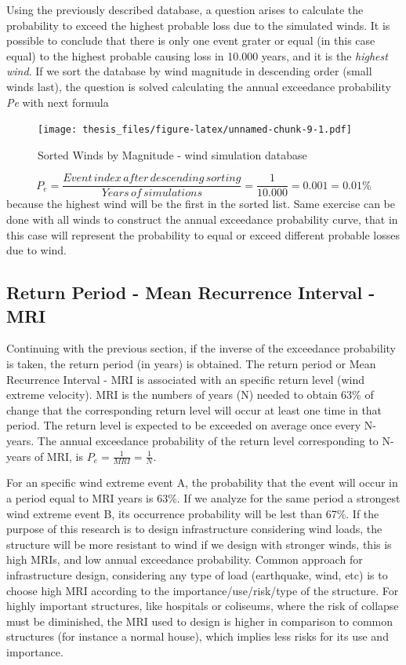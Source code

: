 \documentclass[12pt,oneside]{reedthesis}
\begin{document}
Using the previously described database, a question arises to calculate the probability to exceed the highest probable loss due to the simulated winds. It is possible to conclude that there is only one event grater or equal (in this case equal) to the highest probable causing loss in 10.000 years, and it is the \emph{highest wind}. If we sort the database by wind magnitude in descending order (small winds last), the question is solved calculating the annual exceedance probability \emph{Pe} with next formula

\footnotesize
\begin{figure}
\centering
\texttt{[image: thesis\_files/figure-latex/unnamed-chunk-9-1.pdf]}
\caption{\label{fig:unnamed-chunk-9}Sorted Winds by Magnitude - wind simulation database}
\end{figure}
\normalsize

\[
P_e = \frac{Event\,index\,after\,descending\,sorting}{Years\,of\,simulations } = \frac{1}{10.000}=0.001=0.01\%
\]
because the highest wind will be the first in the sorted list. Same exercise can be done with all winds to construct the annual exceedance probability curve, that in this case will represent the probability to equal or exceed different probable losses due to wind.

\hypertarget{return-period---mean-recurrence-interval---mri}{%
\subsection{Return Period - Mean Recurrence Interval - MRI}\label{return-period---mean-recurrence-interval---mri}}

Continuing with the previous section, if the inverse of the exceedance probability is taken, the return period (in years) is obtained. The return period or Mean Recurrence Interval - MRI is associated with an specific return level (wind extreme velocity). MRI is the numbers of years (N) needed to obtain 63\% of change that the corresponding return level will occur at least one time in that period. The return level is expected to be exceeded on average once every N-years. The annual exceedance probability of the return level corresponding to N-years of MRI, is \(P_e=\frac{1}{MRI}=\frac{1}{N}\).

For an specific wind extreme event A, the probability that the event will occur in a period equal to MRI years is 63\%. If we analyze for the same period a strongest wind extreme event B, its occurrence probability will be lest than 67\%. If the purpose of this research is to design infrastructure considering wind loads, the structure will be more resistant to wind if we design with stronger winds, this is high MRIs, and low annual exceedance probability. Common approach for infrastructure design, considering any type of load (earthquake, wind, etc) is to choose high MRI according to the importance/use/risk/type of the structure. For highly important structures, like hospitals or coliseums, where the risk of collapse must be diminished, the MRI used to design is higher in comparison to common structures (for instance a normal house), which implies less risks for its use and importance.
\end{document}
